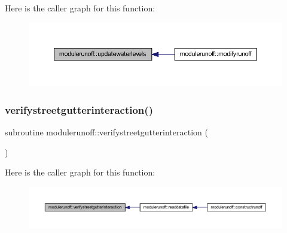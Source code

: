 Here is the caller graph for this function\+:
\nopagebreak
\begin{figure}[H]
\begin{center}
\leavevmode
\includegraphics[width=350pt]{namespacemodulerunoff_ae21623961ce63cf7c148437e7ad9d934_icgraph}
\end{center}
\end{figure}
\mbox{\label{namespacemodulerunoff_ae19f70ae654f145d09a7ca02839d4f11}} 
\subsubsection{\texorpdfstring{verifystreetgutterinteraction()}{verifystreetgutterinteraction()}}
{\footnotesize\ttfamily subroutine modulerunoff\+::verifystreetgutterinteraction (\begin{DoxyParamCaption}{ }\end{DoxyParamCaption})\hspace{0.3cm}{\ttfamily [private]}}

Here is the caller graph for this function\+:
\nopagebreak
\begin{figure}[H]
\begin{center}
\leavevmode
\includegraphics[width=350pt]{namespacemodulerunoff_ae19f70ae654f145d09a7ca02839d4f11_icgraph}
\end{center}
\end{figure}
\mbox{\label{namespacemodulerunoff_a2f27139bf5cc235ef3e04522e63d2f5d}} 
